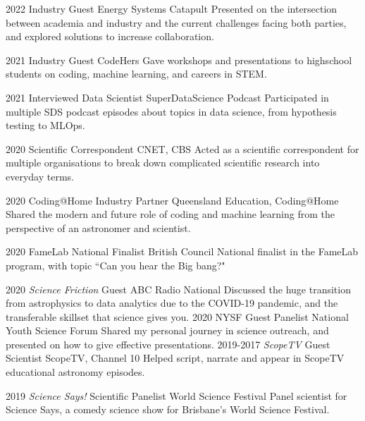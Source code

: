 \begin{entrylist}
\entry
    {2022}
    {Industry Guest}
    {Energy Systems Catapult}
    {Presented on the intersection between academia and industry and the current challenges facing both parties, and explored solutions to increase collaboration.}
\end{entrylist}
\begin{entrylist}
\entry
    {2021}
    {Industry Guest}
    {CodeHers}
    {Gave workshops and presentations to highschool students on coding, machine learning, and careers in STEM.}
\end{entrylist}
\begin{entrylist}
\entry
    {2021}
    {Interviewed Data Scientist}
    {SuperDataScience Podcast}
    {Participated in multiple SDS podcast episodes about topics in data science, from hypothesis testing to MLOps.}
\end{entrylist}
\begin{entrylist}
\entry
    {2020}
    {Scientific Correspondent}
    {CNET, CBS}
    {Acted as a scientific correspondent for multiple organisations to break down complicated scientific research into everyday terms.}
\end{entrylist}
\begin{entrylist}
\entry
	{2020}
	{Coding@Home Industry Partner}
	{Queensland Education, Coding@Home}
	{Shared the modern and future role of coding and machine learning from the perspective of an astronomer and scientist.}
\end{entrylist}
\begin{entrylist}
\entry
    {2020}
    {FameLab National Finalist}
    {British Council}
    {National finalist in the FameLab program, with topic ``Can you hear the Big bang?"}
\end{entrylist}
\begin{entrylist}
\entry
    {2020}
    {\textit{Science Friction} Guest}
    {ABC Radio National}
    {Discussed the huge transition from astrophysics to data analytics due to the COVID-19 pandemic, and the transferable skillset that science gives you.}
\entry
	{2020}
	{NYSF Guest Panelist}
	{National Youth Science Forum}
	{Shared my personal journey in science outreach, and presented on how to give effective presentations.}
\entry
	{2019-2017}
	{\textit{ScopeTV} Guest Scientist}
	{ScopeTV, Channel 10}
	{Helped script, narrate and appear in ScopeTV educational astronomy episodes.}
\end{entrylist}
\begin{entrylist}
\entry
	{2019}
	{\textit{Science Says!} Scientific Panelist}
	{World Science Festival}
	{Panel scientist for Science Says, a comedy science show for Brisbane's World Science Festival.}
\end{entrylist}
